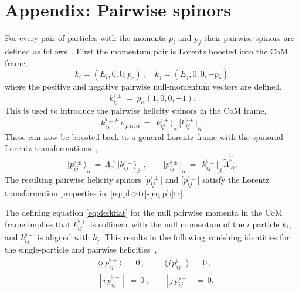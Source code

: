\documentclass[a4paper,11pt]{article}
\begin{document}
\newpage 
\appendix

\section{Appendix: Pairwise spinors}
\label{app:Son}

\noindent For every pair of particles with the momenta $p_i$ and $p_j$ their pairwise spinors are defined as follows~\cite{Csaki:2020inw}.
First the momentum pair is Lorentz boosted into the CoM frame,
\begin{equation}
k_i = (E_i,0,0,p_c)\,, \quad k_j = (E_j,0,0,-p_c)\,
\end{equation}
where the positive and negative pairwise null-momentum vectors are defined,
\begin{equation}
\label{eq:defkflat}
k^{\flat \pm}_{ij}\,=\, p_c\, (1,0,0,\pm 1).
\end{equation}
This is used to introduce the pairwise helicity spinors in the CoM frame,
\begin{equation}
k^{\flat \pm\, \mu}_{ij}\, \sigma_{\mu\, \alpha, \dot{\alpha}}\,=\, {|k^{\flat \pm}_{ij}\rangle}_{\alpha}\,{ [k^{\flat \pm}_{ij}|}_{\dot\alpha}.
\end{equation}
These can now be boosted back to a general Lorentz frame with the spinorial Lorentz transformations~\cite{Csaki:2020inw},
\begin{equation}
 {|p^{\flat \pm}_{ij}\rangle}_{\alpha}\,=\,\Lambda_{\alpha}^{\,\, \beta}\,{|k^{\flat \pm}_{ij}\rangle}_{\beta}
 \,\,, \qquad
  { [p^{\flat \pm}_{ij}|}_{\dot\alpha}\,=\, 
 { [k^{\flat \pm}_{ij}|}_{\dot\beta} \, \tilde\Lambda^{\dot\beta}_{\,\, \dot\alpha}.
\end{equation}
The resulting pairwise helicity spinors $[p^{\flat \pm}_{ij}|$ and $[p^{\flat \pm}_{ij}|$ satisfy the Lorentz transformation 
properties in~\eqref{eq:pb>tr}-\eqref{eq:pb]tr}.

The defining equation \eqref{eq:defkflat} for the null pairwise momenta in the CoM frame implies 
that $k^{\flat +}_{ij}$ is collinear with the null momentum of the $i$ particle $k_i$, and $k^{\flat -}_{ij}$ is aligned with $k_j$. 
This results in the following vanishing identities for the single-particle and pairwise helicities~\cite{Csaki:2020inw},
\begin{eqnarray}
\label{eq:ang0}
&\langle i\, p^{\flat +}_{ij}\rangle\,=\,0 \,, 
 \quad &\langle j\, p^{\flat -}_{ij}\rangle \,=\,0 \,,\\
 \label{eq:sq0}
 &[ i\, p^{\flat +}_{ij}]\,=\,0 \,, 
 \quad &[ j\, p^{\flat -}_{ij}] \,=\,0.
\end{eqnarray}

\bigskip


%


\clearpage
\appendix

\end{document}
